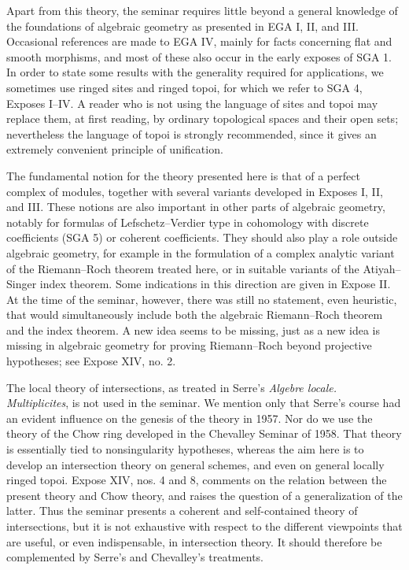 \documentclass[14pt]{extarticle}
\begin{document}
Apart from this theory, the seminar requires little beyond a general knowledge of the foundations of algebraic geometry as presented in EGA I, II, and III. Occasional references are made to EGA IV, mainly for facts concerning flat and smooth morphisms, and most of these also occur in the early exposes of SGA 1. In order to state some results with the generality required for applications, we sometimes use ringed sites and ringed topoi, for which we refer to SGA 4, Exposes I--IV. A reader who is not using the language of sites and topoi may replace them, at first reading, by ordinary topological spaces and their open sets; nevertheless the language of topoi is strongly recommended, since it gives an extremely convenient principle of unification.

The fundamental notion for the theory presented here is that of a perfect complex of modules, together with several variants developed in Exposes I, II, and III. These notions are also important in other parts of algebraic geometry, notably for formulas of Lefschetz--Verdier type in cohomology with discrete coefficients (SGA 5) or coherent coefficients. They should also play a role outside algebraic geometry, for example in the formulation of a complex analytic variant of the Riemann--Roch theorem treated here, or in suitable variants of the Atiyah--Singer index theorem. Some indications in this direction are given in Expose II. At the time of the seminar, however, there was still no statement, even heuristic, that would simultaneously include both the algebraic Riemann--Roch theorem and the index theorem. A new idea seems to be missing, just as a new idea is missing in algebraic geometry for proving Riemann--Roch beyond projective hypotheses; see Expose XIV, no. 2.

The local theory of intersections, as treated in Serre's \emph{Algebre locale. Multiplicites}, is not used in the seminar. We mention only that Serre's course had an evident influence on the genesis of the theory in 1957. Nor do we use the theory of the Chow ring developed in the Chevalley Seminar of 1958. That theory is essentially tied to nonsingularity hypotheses, whereas the aim here is to develop an intersection theory on general schemes, and even on general locally ringed topoi. Expose XIV, nos. 4 and 8, comments on the relation between the present theory and Chow theory, and raises the question of a generalization of the latter. Thus the seminar presents a coherent and self-contained theory of intersections, but it is not exhaustive with respect to the different viewpoints that are useful, or even indispensable, in intersection theory. It should therefore be complemented by Serre's and Chevalley's treatments.
\end{document}
